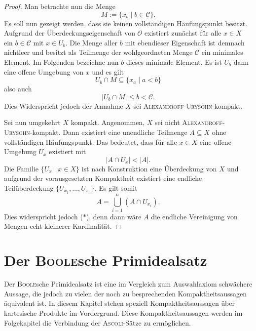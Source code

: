 \begin{proof}
  Man betrachte nun die Menge
  \begin{displaymath}
    M := \{ x_b \mid b \in \mathcal{C} \}.
  \end{displaymath}
  Es soll nun gezeigt werden, dass sie keinen vollständigen Häufungspunkt besitzt. 
  Aufgrund der Überdeckungseigenschaft von $\mathcal{O}$ existiert zunächst für alle $x \in X$ ein $b \in \mathcal{C}$ mit $x \in U_b$.
  Die Menge aller $b$ mit ebendieser Eigenschaft ist demnach nichtleer und besitzt als Teilmenge der wohlgeordneten Menge $\mathcal{C}$ ein minimales Element.
  Im Folgenden bezeichne nun $b$ dieses minimale Element.
  Es ist $U_b$ dann eine offene Umgebung von $x$ und es gilt 
  \begin{displaymath}
    U_b \cap M \subseteq \{x_a \mid a < b\}
  \end{displaymath}
  also auch
  \begin{displaymath}
    |U_b \cap M| \leq b < \mathcal{C}.
  \end{displaymath}
  Dies Widerspricht jedoch der Annahme $X$ sei \textsc{Alexandroff}-\textsc{Urysohn}-kompakt.

  Sei nun umgekehrt $X$ kompakt.
  Angenommen, $X$ sei nicht \textsc{Alexandroff}-\textsc{Urysohn}-kompakt.
  Dann existiert eine unendliche Teilmenge $A \subseteq X$ ohne vollständigen Häufungspunkt.
  Das bedeutet, dass für alle $x \in X$ eine offene Umgebung $U_x$ existiert mit
  \begin{displaymath}
    | A \cap U_x | < | A |. \tag{$\ast$}
  \end{displaymath}
  Die Familie $\{U_x \mid x \in X\}$ ist nach Konstruktion eine Überdeckung von $X$ und aufgrund der vorausgesetzten Kompaktheit existiert eine endliche Teilüberdeckung $\{U_{x_1},\dots,U_{x_n}\}$.
  Es gilt somit
  \begin{displaymath}
    A = \bigcup_{i = 1}^n (A \cap U_{x_i}).
  \end{displaymath}
  Dies widerspricht jedoch ($\ast$), denn dann wäre $A$ die endliche Vereinigung von Mengen echt kleinerer Kardinalität. 
\end{proof}

\section{Der \textsc{Boole}sche Primidealsatz}

Der \textsc{Boole}sche Primidealsatz ist eine im Vergleich zum Auswahlaxiom schwächere Aussage, die jedoch zu vielen der noch zu besprechenden Kompaktheitsaussagen äquivalent ist. In diesem Kapitel stehen speziell Kompaktheitsaussagen über kartesische Produkte im Vordergrund. Diese Kompaktheitsaussagen werden im Folgekapitel die Verbindung der \textsc{Ascoli}-Sätze zu \PIT ermöglichen.


